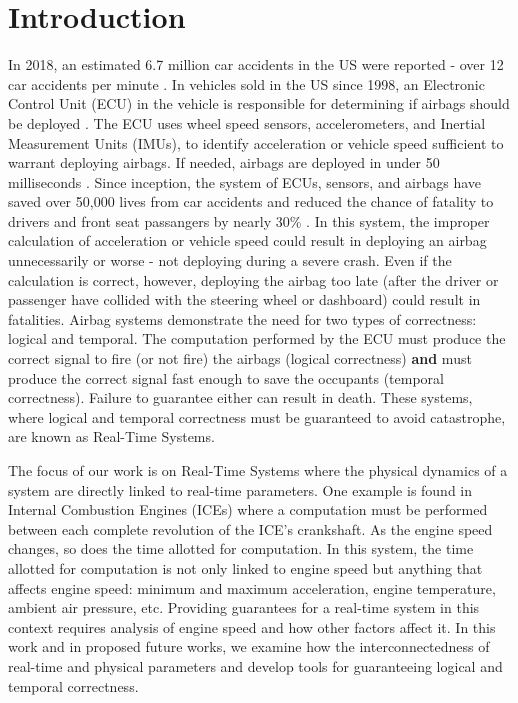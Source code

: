 \section{Introduction}   \label{chap:introduction}

In 2018, an estimated 6.7 million car accidents in the US were reported - over 12 car accidents per minute \cite{national_highway_traffic_safety_administration_traffic_nodate}.
In vehicles sold in the US since 1998, an Electronic Control Unit (ECU) in the vehicle is responsible for determining if airbags should be deployed \cite{insurance_institute_for_highway_safety_airbags_nodate}.
The ECU uses wheel speed sensors, accelerometers, and Inertial Measurement Units (IMUs), to identify acceleration or vehicle speed sufficient to warrant deploying airbags. 
If needed, airbags are deployed in under 50 milliseconds \cite{national_highway_traffic_safety_administration_air_2016}.
Since inception, the system of ECUs, sensors, and airbags have saved over 50,000 lives from car accidents and reduced the chance of fatality to drivers and front seat passangers by nearly 30\% \cite{insurance_institute_for_highway_safety_airbags_nodate}.
In this system, the improper calculation of acceleration or vehicle speed could result in deploying an airbag unnecessarily or worse - not deploying during a severe crash.
Even if the calculation is correct, however, deploying the airbag too late (after the driver or passenger have collided with the steering wheel or dashboard) could result in fatalities.
Airbag systems demonstrate the need for two types of correctness: logical and temporal.
The computation performed by the ECU must produce the correct signal to fire (or not fire) the airbags (logical correctness) \textbf{and} must produce the correct signal fast enough to save the occupants (temporal correctness).
Failure to guarantee either can result in death.
These systems, where logical and temporal correctness must be guaranteed to avoid catastrophe, are known as Real-Time Systems.

The focus of our work is on Real-Time Systems where the physical dynamics of a system are directly linked to real-time parameters.
One example is found in Internal Combustion Engines (ICEs) where a computation must be performed between each complete revolution of the ICE's crankshaft.
As the engine speed changes, so does the time allotted for computation.
In this system, the time allotted for computation is not only linked to engine speed but anything that affects engine speed: minimum and maximum acceleration, engine temperature, ambient air pressure, etc.
Providing guarantees for a real-time system in this context requires analysis of engine speed and how other factors affect it. 
In this work and in proposed future works, we examine how the interconnectedness of real-time and physical parameters and develop tools for guaranteeing logical and temporal correctness.

